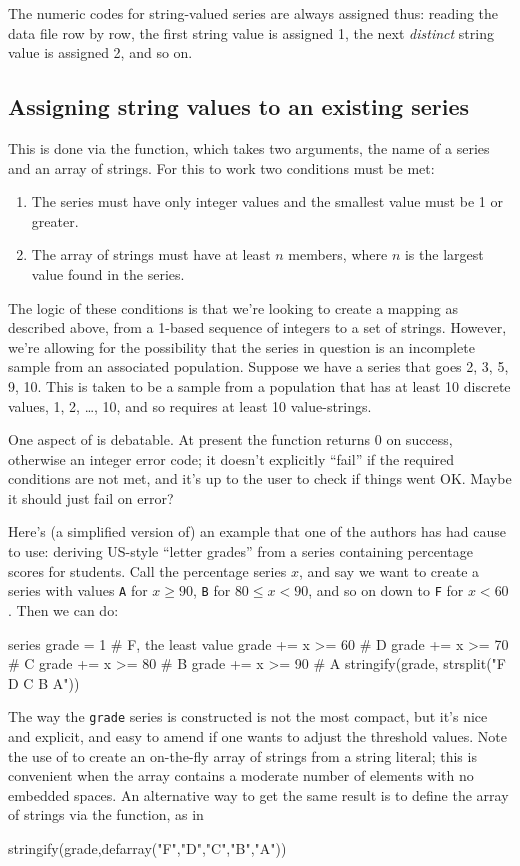 The numeric codes for string-valued series are always assigned thus:
reading the data file row by row, the first string value is assigned
1, the next \textit{distinct} string value is assigned 2, and so on.

\subsection{Assigning string values to an existing series}
\label{sec:stringify}

This is done via the  function, which takes two
arguments, the name of a series and an array of strings. For this to
work two conditions must be met:

\begin{enumerate}
\item The series must have only integer values and the smallest value
  must be 1 or greater.
\item The array of strings must have at least $n$ members, where $n$
  is the largest value found in the series.
\end{enumerate}

The logic of these conditions is that we're looking to create a
mapping as described above, from a 1-based sequence of integers to a
set of strings. However, we're allowing for the possibility that the
series in question is an incomplete sample from an associated
population. Suppose we have a series that goes 2, 3, 5, 9, 10. This is
taken to be a sample from a population that has at least 10 discrete
values, 1, 2, \dots{}, 10, and so requires at least 10 value-strings.

One aspect of  is debatable. At present the
function returns 0 on success, otherwise an integer error code; it
doesn't explicitly ``fail'' if the required conditions are not met,
and it's up to the user to check if things went OK. Maybe it should
just fail on error?

Here's (a simplified version of) an example that one of the authors
has had cause to use: deriving US-style ``letter grades'' from a
series containing percentage scores for students. Call the percentage
series $x$, and say we want to create a series with values \texttt{A}
for $x \geq 90$, \texttt{B} for $80 \leq x <90$, and so on down to
\texttt{F} for $x<60$. Then we can do:
\begin{code}
series grade = 1 # F, the least value
grade += x >= 60 # D
grade += x >= 70 # C
grade += x >= 80 # B
grade += x >= 90 # A
stringify(grade, strsplit("F D C B A"))
\end{code}
%
The way the \texttt{grade} series is constructed is not the most
compact, but it's nice and explicit, and easy to amend if one wants to
adjust the threshold values. Note the use of  to
create an on-the-fly array of strings from a string literal; this is
convenient when the array contains a moderate number of elements with
no embedded spaces. An alternative way to get the same result is to
define the array of strings via the  function, as in
\begin{code}
stringify(grade,defarray("F","D","C","B","A"))
\end{code}



